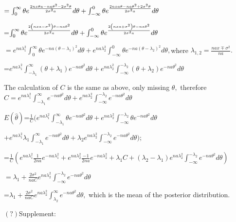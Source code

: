\documentclass{article}
\begin{document}
$=\int_{0}^{\infty }\theta e^{\frac{2nx\theta a-na\theta ^{2}-2\sigma
^{2}\theta }{2\sigma ^{2}a}}d\theta +\int_{-\infty }^{0}\theta e^{\frac{%
2nxa\theta -na\theta ^{2}+2\sigma ^{2}\theta }{2\sigma ^{2}a}}d\theta $

=$\int_{0}^{\infty }\theta e^{\frac{2\left( nxa-\sigma ^{2}\right) \theta
-na\theta ^{2}}{2\sigma ^{2}a}}d\theta +\int_{-\infty }^{0}\theta e^{\frac{%
2\left( nxa+\sigma ^{2}\right) \theta -na\theta ^{2}}{2\sigma ^{2}a}}d\theta 
$

$=e^{na\lambda _{1}^{2}}\int_{0}^{\infty }\theta e^{-na\left( \theta
-\lambda _{1}\right) ^{2}}d\theta +e^{na\lambda _{2}^{2}}\int_{-\infty
}^{0}\theta e^{-na\left( \theta -\lambda _{2}\right) ^{2}}d\theta ,$where $%
\lambda _{1,2}=\frac{nax\mp \sigma ^{2}}{na}.$

=$e^{na\lambda _{1}^{2}}\int_{-\lambda _{1}}^{\infty }\left( \theta +\lambda
_{1}\right) e^{-na\theta ^{2}}d\theta +e^{na\lambda _{2}^{2}}\int_{-\infty
}^{-\lambda _{2}}\left( \theta +\lambda _{2}\right) e^{-na\theta
^{2}}d\theta $

\bigskip The calculation of $C$ is the same as above, only missing $\theta ,$%
therefore $C=e^{na\lambda _{1}^{2}}\int_{-\lambda _{1}}^{\infty
}e^{-na\theta ^{2}}d\theta +e^{na\lambda _{2}^{2}}\int_{-\infty }^{-\lambda
_{2}}e^{-na\theta ^{2}}d\theta $

$E\left( \hat{\theta}\right) $=$\frac{1}{C}(e^{na\lambda
_{1}^{2}}\int_{-\lambda _{1}}^{\infty }\theta e^{-na\theta ^{2}}d\theta
+e^{na\lambda _{2}^{2}}\int_{-\infty }^{-\lambda _{2}}\theta e^{-na\theta
^{2}}d\theta $

$+e^{na\lambda _{1}^{2}}\lambda _{1}\int_{-\lambda _{1}}^{\infty
}e^{-na\theta ^{2}}d\theta +\lambda _{2}e^{na\lambda _{2}^{2}}\int_{-\infty
}^{-\lambda _{2}}e^{-na\theta ^{2}}d\theta );$

=$\frac{1}{C}(e^{na\lambda _{1}^{2}}\frac{1}{2na}e^{-na\lambda
_{1}^{2}}+e^{na\lambda _{2}^{2}}\frac{-1}{2na}e^{-na\lambda
_{2}^{2}}+\lambda _{1}C+\left( \lambda _{2}-\lambda _{1}\right) e^{na\lambda
_{2}^{2}}\int_{-\infty }^{-\lambda _{2}}e^{-na\theta ^{2}}d\theta )$

$=\lambda _{1}+\frac{2\sigma ^{2}}{naC}e^{na\lambda _{2}^{2}}\int_{-\infty
}^{-\lambda _{2}}e^{-na\theta ^{2}}d\theta $

=$\lambda _{1}+\frac{2\sigma ^{2}}{naC}e^{na\lambda _{2}^{2}}\int_{\lambda
_{2}}^{\infty }e^{-na\theta ^{2}}d\theta ,$ which is the mean of the
posterior distribution. 

\bigskip $\left( ?\right) $Supplement:
\end{document}
